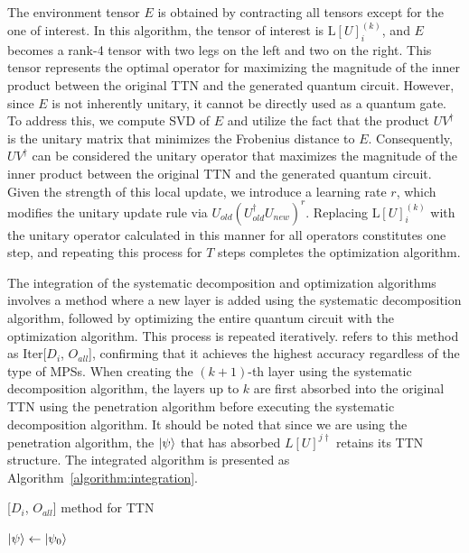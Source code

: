 \documentclass[12pt,dvipdfmx,twoside,openright]{report}
\begin{document}
The environment tensor $E$ is obtained by contracting all tensors except for the one of interest.
In this algorithm, the tensor of interest is $\mathrm{L}[U]^{(k)}_i$, and $E$ becomes a rank-4 tensor with two legs on the left and two on the right.
This tensor represents the optimal operator for maximizing the magnitude of the inner product between the original TTN and the generated quantum circuit.
However, since $E$ is not inherently unitary, it cannot be directly used as a quantum gate.
To address this, we compute SVD of $E$ and utilize the fact that the product $UV^\dagger$ is the unitary matrix that minimizes the Frobenius distance to $E$.
Consequently, $UV^\dagger$ can be considered the unitary operator that maximizes the magnitude of the inner product between the original TTN and the generated quantum circuit.
Given the strength of this local update, we introduce a learning rate $r$, which modifies the unitary update rule via $U_{old}(U_{old}^\dagger U_{new})^r$. 
Replacing $\mathrm{L}[U]^{(k)}_i$ with the unitary operator calculated in this manner for all operators constitutes one step, and repeating this process for $T$ steps completes the optimization algorithm.

The integration of the systematic decomposition and optimization algorithms involves a method where a new layer is added using the systematic decomposition algorithm, followed by optimizing the entire quantum circuit with the optimization algorithm.
This process is repeated iteratively.
\cite{mpsdecomp} refers to this method as Iter[$D_i$, $O_{all}$], confirming that it achieves the highest accuracy regardless of the type of MPSs.
When creating the $(k+1)$-th layer using the systematic decomposition algorithm, the layers up to $k$ are first absorbed into the original TTN using the penetration algorithm before executing the systematic decomposition algorithm.
It should be noted that since we are using the penetration algorithm, the $\ket{\psi}$ that has absorbed $L[U]^{j\dagger}$ retains its TTN structure.
The integrated algorithm is presented as Algorithm~\ref{algorithm:integration}.
\begin{algorithm}[tbp]
 \caption{[$D_i$, $O_{all}$] method for TTN}
 \label{algorithm:integration}
 $\ket{\psi} \leftarrow{\ket{\psi_0}}$\;
\end{algorithm}
\end{document}
